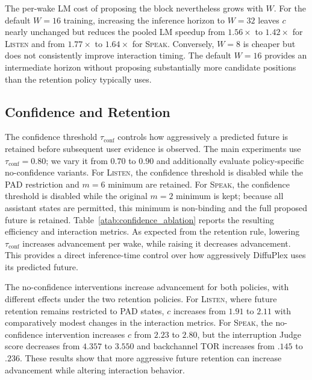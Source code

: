 The per-wake LM cost of proposing the block nevertheless grows with $W$.
For the default $W=16$ training, increasing the inference horizon to $W=32$ leaves $c$ nearly unchanged but reduces the pooled LM speedup from $1.56\times$ to $1.42\times$ for \textsc{Listen} and from $1.77\times$ to $1.64\times$ for \textsc{Speak}.
Conversely, $W=8$ is cheaper but does not consistently improve interaction timing.
The default $W=16$ provides an intermediate horizon without proposing substantially more candidate positions than the retention policy typically uses.



\subsection{Confidence and Retention}
\label{asubsec:confidence_retention}

The confidence threshold $\tau_{\mathrm{conf}}$ controls how aggressively a predicted future is retained before subsequent user evidence is observed.
The main experiments use $\tau_{\mathrm{conf}}=0.80$; we vary it from $0.70$ to $0.90$ and additionally evaluate policy-specific no-confidence variants.
For \textsc{Listen}, the confidence threshold is disabled while the PAD restriction and $m=6$ minimum are retained. For \textsc{Speak}, the confidence threshold is disabled while the original $m=2$ minimum is kept; because all assistant states are permitted, this minimum is non-binding and the full proposed future is retained.
Table~\ref{atab:confidence_ablation} reports the resulting efficiency and interaction metrics.
As expected from the retention rule, lowering $\tau_{\mathrm{conf}}$ increases advancement per wake, while raising it decreases advancement.
This provides a direct inference-time control over how aggressively DiffuPlex uses its predicted future.

The no-confidence interventions increase advancement for both policies, with different effects under the two retention policies.
For \textsc{Listen}, where future retention remains restricted to PAD states, $c$ increases from $1.91$ to $2.11$ with comparatively modest changes in the interaction metrics.
For \textsc{Speak}, the no-confidence intervention increases $c$ from $2.23$ to $2.80$, but the interruption Judge score decreases from $4.357$ to $3.550$ and backchannel TOR increases from $.145$ to $.236$.
These results show that more aggressive future retention can increase advancement while altering interaction behavior.

